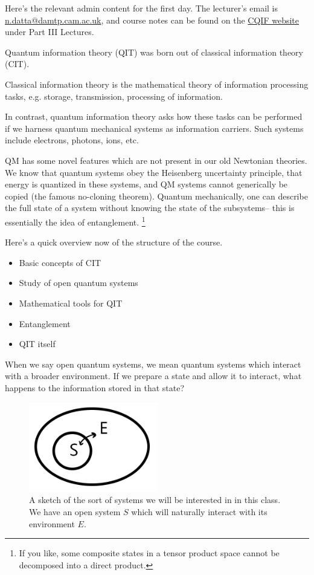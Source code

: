 \begin{note}
    Here's the relevant admin content for the first day. The lecturer's email is \url{n.datta@damtp.cam.ac.uk}, and course notes can be found on the \href{http://www.qi.damtp.cam.ac.uk/node/223}{CQIF website} under Part III Lectures.
\end{note}

Quantum information theory (QIT) was born out of classical information theory (CIT).
\begin{defn}
Classical information theory is the mathematical theory of information processing tasks, e.g. storage, transmission, processing of information.
\end{defn}
In contrast, quantum information theory asks how these tasks can be performed if we harness quantum mechanical systems as information carriers. Such systems include electrons, photons, ions, etc.

QM has some novel features which are not present in our old Newtonian theories. We know that quantum systems obey the Heisenberg uncertainty principle, that energy is quantized in these systems, and QM systems cannot generically be copied (the famous no-cloning theorem).
Quantum mechanically, one can describe the full state of a system without knowing the state of the subsystems-- this is essentially the idea of entanglement.%
    \footnote{If you like, some composite states in a tensor product space cannot be decomposed into a direct product.}

Here's a quick overview now of the structure of the course.
\begin{itemize}
    \item Basic concepts of CIT
    \item Study of open quantum systems
    \item Mathematical tools for QIT
    \item Entanglement
    \item QIT itself
\end{itemize}
When we say open quantum systems, we mean quantum systems which interact with a broader environment. If we prepare a state and allow it to interact, what happens to the information stored in that state?

\begin{figure}
    \centering
    \includegraphics[width=0.5\textwidth]{2019/01/20190118_opensystem.png}
    \caption{A sketch of the sort of systems we will be interested in in this class. We have an open system $S$ which will naturally interact with its environment $E$.}
    \label{fig:opensystem}
\end{figure}
